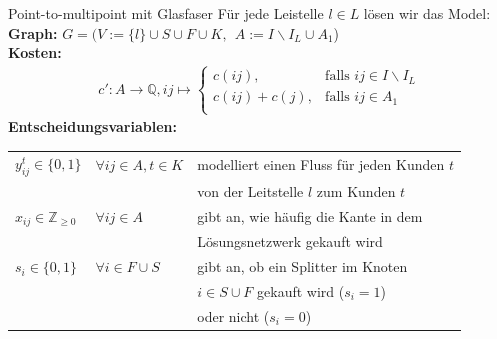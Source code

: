 \documentclass{beamer}
\newcommand{\Q}{\mathbb{Q}}
\newcommand{\Z}{\mathbb{Z}}
\begin{document}
		
	\begin{frame}{Point-to-multipoint mit Glasfaser}
	F\"ur jede Leistelle $l \in L$ l\"osen wir das Model: \\
	\vspace{0.2cm}
	\textbf{Graph:}  $G=(V:=\{l\}\cup S \cup F \cup K ,\: \:   A:= I\backslash I_L \cup A_1$)\\
	\vspace{0.2cm}
	\textbf{Kosten:}\begin{align*}
	c': A \rightarrow \Q, ij  \mapsto \left\{\begin{array}{cl} 
	c(ij), & \text{falls } ij \in I\backslash I_L\\ 
	c(ij)+c(j), & \text{falls } ij \in A_1\\ 
	\end{array}
	\right.
	\end{align*}
	\textbf{Entscheidungsvariablen:}\\
	\begin{tabular}{lll}
			$y_{ij}^t \in \{0,1\}$ &$\forall ij \in A, t\in K $ & modelliert einen Fluss für jeden Kunden $t$ \\
			&&von der Leitstelle $l$ zum Kunden $t$\\
			$x_{ij} \in \Z_{\geq 0}$ & $\forall ij \in A$ &gibt an, wie häufig die Kante in dem \\
			&&Lösungsnetzwerk gekauft wird\\
			$s_i \in \{0,1\}$ & $\forall i \in F \cup S$ & gibt an, ob ein Splitter im Knoten \\
			&&$i\in S \cup F$ gekauft wird ($s_i=1$)\\
			 &&oder nicht ($s_i=0$)
	\end{tabular}

\end{frame}
	
\end{document}
